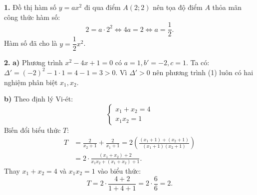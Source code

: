 \begin{loi_giai_cau}
\textbf{1.} Đồ thị hàm số $y = ax^2$ đi qua điểm $A(2; 2)$ nên tọa độ điểm $A$ thỏa mãn công thức hàm số:
\[2 = a \cdot 2^2 \iff 4a = 2 \iff \boxed{a = \dfrac{1}{2}}.\]
Hàm số đã cho là $y = \dfrac{1}{2}x^2$.

\textbf{2.}
\textbf{a)} Phương trình $x^2 - 4x + 1 = 0$ có $a = 1, b' = -2, c = 1$.
Ta có: $\Delta' = (-2)^2 - 1 \cdot 1 = 4 - 1 = 3 > 0$.
Vì $\Delta' > 0$ nên phương trình (1) luôn có hai nghiệm phân biệt $x_1, x_2$.

\textbf{b)} Theo định lý Vi-ét:
\[\begin{cases} x_1 + x_2 = 4 \\ x_1 x_2 = 1 \end{cases}\]
Biến đổi biểu thức $T$:
\begin{align*}
T &= \frac{2}{x_2+1} + \frac{2}{x_1+1} = 2 \left(\frac{(x_1+1) + (x_2+1)}{(x_1+1)(x_2+1)}\right) \\
&= 2 \cdot \frac{(x_1+x_2) + 2}{x_1 x_2 + (x_1+x_2) + 1}.
\end{align*}
Thay $x_1+x_2 = 4$ và $x_1 x_2 = 1$ vào biểu thức:
\[T = 2 \cdot \frac{4 + 2}{1 + 4 + 1} = 2 \cdot \frac{6}{6} = \boxed{2}.\]
\end{loi_giai_cau}
